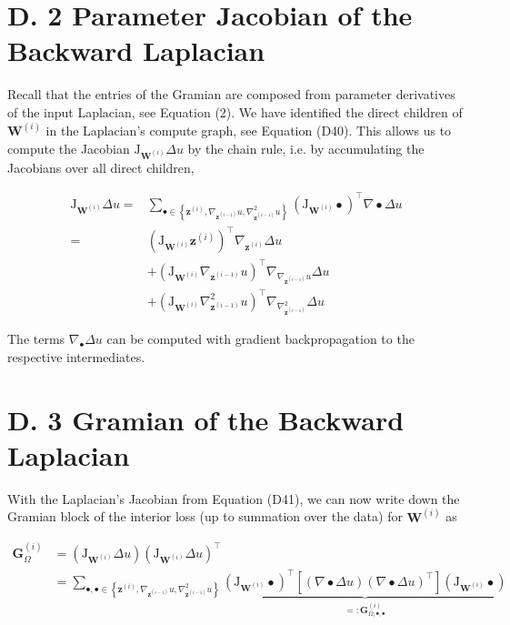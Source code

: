 \documentclass[10pt]{article}
\begin{document}
\section*{D. 2 Parameter Jacobian of the Backward Laplacian}
Recall that the entries of the Gramian are composed from parameter derivatives of the input Laplacian, see Equation (2). We have identified the direct children of $\boldsymbol{W}^{(i)}$ in the Laplacian's compute graph, see Equation (D40). This allows us to compute the Jacobian $\mathrm{J}_{\boldsymbol{W}^{(i)}} \Delta u$ by the chain rule, i.e. by accumulating the Jacobians over all direct children,


\begin{align*}
\mathrm{J}_{\boldsymbol{W}^{(i)}} \Delta u= & \sum_{\bullet \in\left\{\boldsymbol{z}^{(i)}, \nabla_{\boldsymbol{z}^{(i-1)}} u, \nabla_{\boldsymbol{z}^{(i-1)}}^{2} u\right\}}\left(\mathrm{J}_{\boldsymbol{W}^{(i)}} \bullet\right)^{\top} \nabla \bullet \Delta u \\
= & \left(\mathrm{J}_{\boldsymbol{W}^{(i)}} \boldsymbol{z}^{(i)}\right)^{\top} \nabla_{\boldsymbol{z}^{(i)}} \Delta u  \tag{D41}\\
& +\left(\mathrm{J}_{\boldsymbol{W}^{(i)}} \nabla_{\boldsymbol{z}^{(i-1)}} u\right)^{\top} \nabla_{\nabla_{\boldsymbol{z}^{(i-1)}} u} \Delta u \\
& +\left(\mathrm{J}_{\boldsymbol{W}^{(i)}} \nabla_{\boldsymbol{z}^{(i-1)}}^{2} u\right)^{\top} \nabla_{\nabla_{\boldsymbol{z}^{(i-1)}}^{2}} \Delta u
\end{align*}


The terms $\nabla_{\bullet} \Delta u$ can be computed with gradient backpropagation to the respective intermediates.

\section*{D. 3 Gramian of the Backward Laplacian}
With the Laplacian's Jacobian from Equation (D41), we can now write down the Gramian block of the interior loss (up to summation over the data) for $\boldsymbol{W}^{(i)}$ as


\begin{align*}
\boldsymbol{G}_{\Omega}^{(i)} & =\left(\mathrm{J}_{\boldsymbol{W}^{(i)}} \Delta u\right)\left(\mathrm{J}_{\boldsymbol{W}^{(i)}} \Delta u\right)^{\top} \\
& =\sum_{\bullet, \bullet \in\left\{\boldsymbol{z}^{(i)}, \nabla_{\boldsymbol{z}^{(i-1)}} u, \nabla_{\boldsymbol{z}^{(i-1)}}^{2} u\right\}} \underbrace{\left(\mathrm{J}_{\boldsymbol{W}^{(i)}} \bullet\right)^{\top}\left[(\nabla \bullet \Delta u)(\nabla \bullet \Delta u)^{\top}\right]\left(\mathrm{J}_{\boldsymbol{W}^{(i)}} \bullet\right)}_{=: \boldsymbol{G}_{\Omega, \bullet, \bullet}^{(i)}} \tag{D42}
\end{align*}
\end{document}
